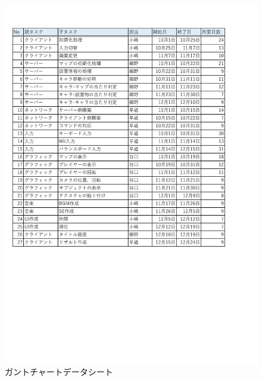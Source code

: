\documentclass{jarticle}
\begin{document}
\begin{figure}[h]
    \centering
    \label{table:gunt1}
    \caption{ガントチャートデータシート}
    \includegraphics[scale=0.5]{guntdat.pdf}
\end{figure}
\end{document}
